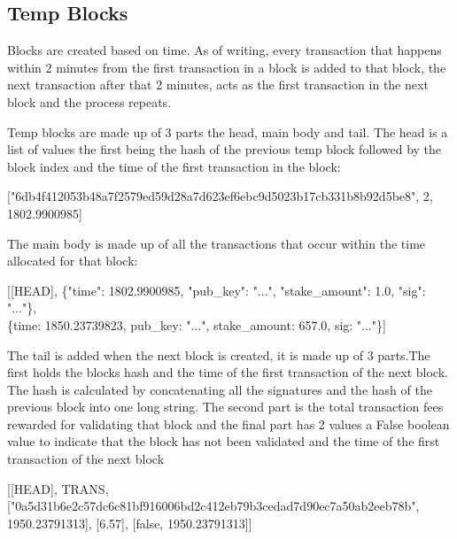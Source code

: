 \documentclass[11pt]{extarticle}
\begin{document}
\subsection{Temp Blocks}
Blocks are created based on time. As of writing, every transaction that happens within 2 minutes from the first transaction in a block is added to that block, the next transaction after that 2 minutes, acts as the first transaction in the next block and the process repeats. 

Temp blocks are made up of 3 parts the head, main body and tail. The head is a list of values the first being the hash of the previous temp block followed by the block index and the time of the first transaction in the block:

\begin{center}
["6db4f412053b48a7f2579ed59d28a7d623ef6ebc9d5023b17cb331b8b92d5be8", 2, 1802.9900985]
\end{center}

The main body is made up of all the transactions that occur within the time allocated for that block:

\begin{center}
[[HEAD], \{"time": 1802.9900985, "pub\_key": "...", "stake\_amount": 1.0, "sig": "..."\},\\          \hspace{0.75cm}\{time: 1850.23739823,  pub\_key: "...",  stake\_amount: 657.0,  sig: "..."\}]
\end{center}

The tail is added when the next block is created, it is made up of 3 parts.The first holds the blocks hash and the time of the first transaction of the next block. The hash is calculated by concatenating all the signatures and the hash of the previous block into one long string. The second part is the total transaction fees rewarded for validating that block and the final part has 2 values a False boolean value to indicate that the block has not been validated and the time of the first transaction of the next block
 
\begin{center}
[[HEAD], TRANS, \\\hspace{0cm}["0a5d31b6e2c57dc6c81bf916006bd2c412eb79b3cedad7d90ec7a50ab2eeb78b", 1950.23791313], [6.57], [false, 1950.23791313]]
\end{center}
\end{document}
